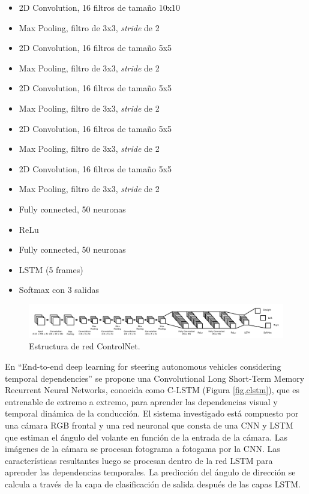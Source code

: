 \begin{itemize}
    \item 2D Convolution, 16 filtros de tamaño 10x10
    \item Max Pooling, filtro de 3x3, \textit{stride} de 2
    \item 2D Convolution, 16 filtros de tamaño 5x5
    \item Max Pooling, filtro de 3x3, \textit{stride} de 2
    \item 2D Convolution, 16 filtros de tamaño 5x5
    \item Max Pooling, filtro de 3x3, \textit{stride} de 2
    \item 2D Convolution, 16 filtros de tamaño 5x5
    \item Max Pooling, filtro de 3x3, \textit{stride} de 2
    \item 2D Convolution, 16 filtros de tamaño 5x5
    \item Max Pooling, filtro de 3x3, \textit{stride} de 2
    \item Fully connected, 50 neuronas
    \item ReLu
    \item Fully connected, 50 neuronas
    \item LSTM (5 frames)
    \item Softmax con 3 salidas
\end{itemize}

\begin{figure}
\begin{center}
	\includegraphics[width=1\textwidth]{figures/Estado_arte/controlnet.png}
   \caption{Estructura de red ControlNet.}
	\label{fig.controlnet}
\end{center}
\end{figure}

En ``End-to-end deep learning for steering autonomous vehicles considering temporal dependencies'' \cite{temporal-dependencies} se propone una Convolutional Long Short-Term Memory Recurrent Neural Networks, conocida como C-LSTM (Figura \ref{fig.clstm}), que es entrenable de extremo a extremo, para aprender las dependencias visual y temporal dinámica de la conducción. El sistema investigado está compuesto por una cámara RGB frontal y una red neuronal que consta de una CNN y LSTM que estiman el ángulo del volante en función de la entrada de la cámara. Las imágenes de la cámara se procesan fotograma a fotogama por la CNN. Las características resultantes luego se procesan dentro de la red LSTM para aprender las dependencias temporales. La predicción del ángulo de dirección se calcula a través de la capa de clasificación de salida después de las capas LSTM.\\

